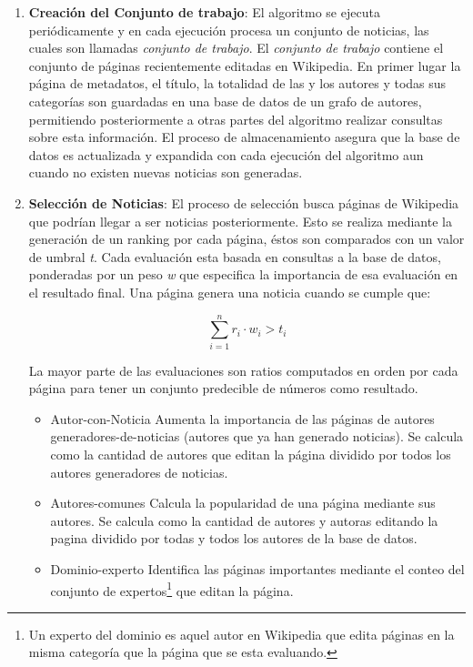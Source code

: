 \begin{enumerate}
	\item \textbf{Creación del Conjunto de trabajo}: El algoritmo se ejecuta periódicamente y en cada ejecución procesa un conjunto de noticias, las cuales son llamadas \emph{conjunto de trabajo}. El \emph{conjunto de trabajo} contiene el conjunto de páginas recientemente editadas en Wikipedia. 
	En primer lugar la página de metadatos, el título, la totalidad de las y los autores y todas sus categorías son guardadas en una base de datos de un grafo de autores, permitiendo posteriormente a otras partes del algoritmo realizar consultas sobre esta información.
	El proceso de almacenamiento asegura que la base de datos es actualizada y expandida con cada ejecución del algoritmo aun cuando no existen nuevas noticias son generadas.	
	
	\item \textbf{Selección de Noticias}:
	El proceso de selección busca páginas de Wikipedia que podrían llegar a ser noticias posteriormente. Esto se realiza mediante la generación de un ranking por cada página, éstos son comparados con un valor de umbral \emph{t}. Cada evaluación esta basada en consultas a la base de datos, ponderadas por un peso \emph{w} que especifica la importancia de esa evaluación en el resultado final. Una página genera una noticia cuando se cumple que:
	
	\begin{equation*}
	\sum_{i=1}^{n} {r_i \cdot w_i} > t_i
	\end{equation*}  
	
    La mayor parte de las evaluaciones son ratios computados en orden por cada página  para tener un conjunto predecible de números como resultado.
	\begin{itemize}
		\item Autor-con-Noticia
		Aumenta la importancia de las páginas de autores generadores-de-noticias (autores que ya han generado noticias). Se calcula como la cantidad de autores que editan la página dividido por todos los autores generadores de noticias.
		
		\item Autores-comunes
		Calcula la popularidad de una página mediante sus autores. Se calcula como la cantidad de autores y autoras editando la pagina dividido por todas y todos los autores de la base de datos.
		
		\item Dominio-experto
		Identifica las páginas importantes mediante el conteo del conjunto de expertos\footnote{ Un experto del dominio es aquel autor en Wikipedia que edita páginas en la misma categoría que la página que se esta evaluando.} que editan la página.
		

\end{itemize}
\end{enumerate}
